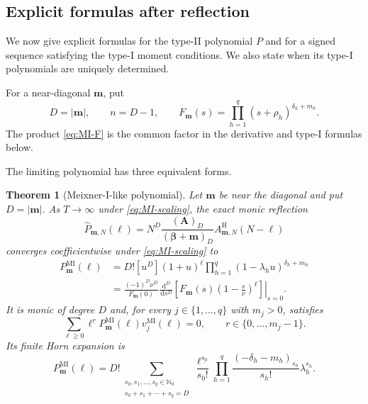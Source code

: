 \documentclass[10pt]{amsart}
\newcommand{\Nzero}{\mathbb N_0}
\newcommand{\dd}{\,\mathrm d}
\newcommand{\A}{\boldsymbol A}
\newcommand{\bbeta}{\boldsymbol\beta}
\newcommand{\mm}{\boldsymbol m}
\newcommand{\abs}[1]{\lvert#1\rvert}
\newcommand{\fall}[2]{#1^{\underline{#2}}}
\theoremstyle{plain}
\newtheorem{theorem}{Theorem}[section]
\theoremstyle{definition}
\theoremstyle{remark}
\begin{document}
\subsection{Explicit formulas after reflection}

We now give explicit formulas for the type-II polynomial \(P\) and for a
signed sequence satisfying the type-I moment conditions. We also state when
its type-I polynomials are uniquely determined.

For a near-diagonal \(\mm\), put
\begin{equation}
 D=\abs\mm,\qquad n=D-1,\qquad
 F_{\mm}(s)=\prod_{h=1}^q(s+\rho_h)^{\delta_h+m_h}.
 \label{eq:MI-F}
\end{equation}
The product \eqref{eq:MI-F} is the common factor in the derivative and
type-I formulas below.

The limiting polynomial has three equivalent forms.

\begin{theorem}[Meixner-I-like polynomial]
\label{thm:MI-A}
Let \(\mm\) be near the diagonal and put \(D=\abs\mm\). As
\(T\to\infty\) under
\eqref{eq:MI-scaling}, the exact monic reflection
\begin{equation}
 \widehat P_{\mm,N}(\ell)
 =\fall{N}{D}\frac{(\A)_D}{(\bbeta+\mm)_D}
 A^{\mathrm H}_{\mm,N}(N-\ell)
 \label{eq:MI-finite-monic-reflection}
\end{equation}
converges coefficientwise under \eqref{eq:MI-scaling} to
\begin{align}
 P_{\mm}^{\mathrm{MI}}(\ell)
 &=D![u^D](1+u)^\ell
   \prod_{h=1}^q(1-\lambda_hu)^{\delta_h+m_h}
 \label{eq:MI-A-coefficient}\\
 &=\frac{(-1)^D\nu^D}{F_{\mm}(0)}
 \left.\frac{\dd^D}{\dd s^D}
 \left[F_{\mm}(s)\left(1-\frac{s}{\nu}\right)^\ell\right]
 \right|_{s=0}.
 \label{eq:MI-A-derivative}
\end{align}
It is monic of degree \(D\) and, for every
\(j\in\{1,\ldots,q\}\) with \(m_j>0\), satisfies
\begin{equation}
 \sum_{\ell\ge0}\fall{\ell}{r}P_{\mm}^{\mathrm{MI}}(\ell)
 v_j^{\mathrm{MI}}(\ell)=0,
 \qquad r\in\{0,\ldots,m_j-1\}.
 \label{eq:MI-A-orthogonality}
\end{equation}
Its finite Horn expansion is
\begin{equation}
 P_{\mm}^{\mathrm{MI}}(\ell)
 =D!\!\sum_{\substack{s_0,s_1,\ldots,s_q\in\Nzero\\
                        s_0+s_1+\cdots+s_q=D}}
 \frac{\fall{\ell}{s_0}}{s_0!}
 \prod_{h=1}^q
 \frac{(-\delta_h-m_h)_{s_h}}{s_h!}\lambda_h^{s_h}.
 \label{eq:MI-A-Horn}
\end{equation}
\end{theorem}
\end{document}
